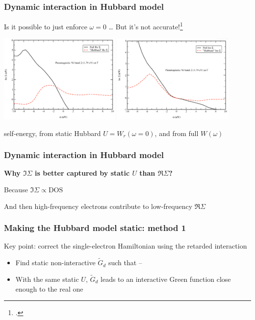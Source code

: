 \documentclass{beamer}
\begin{document}
\begin{frame}
\frametitle{Dynamic interaction in Hubbard model}

Is it possible to just enforce $\omega = 0$ \dots
But it's not accurate!\footcite{aryasetiawan2004frequency}

\begin{center}
    \includegraphics[width=0.45\textwidth]{plots/ni-re-sigma-1.PNG}
    \includegraphics[width=0.45\textwidth]{plots/ni-im-sigma-1.PNG}
\end{center}

 self-energy, from static Hubbard $U = W_r(\omega = 0)$,
and from full $W(\omega)$ 

\end{frame}

\begin{frame}
\frametitle{Dynamic interaction in Hubbard model}

\textbf{Why $\Im \Sigma$ is better captured by static $U$ than $\Re \Sigma$?}

Because $\Im \Sigma \propto \text{DOS}$ %

And then high-frequency electrons contribute to low-frequency $\Re \Sigma$ 

\end{frame}

\begin{frame}
\frametitle{Making the Hubbard model static: method 1}
    
Key point: correct the single-electron Hamiltonian using the retarded interaction

\begin{itemize}
    \item Find static non-interactive $\tilde{G}_d$ such that --
    \item With the same static $U$, $\tilde{G}_d$ leads to 
        an interactive Green function close enough 
        to the real one
\end{itemize}

\end{frame}
\end{document}

